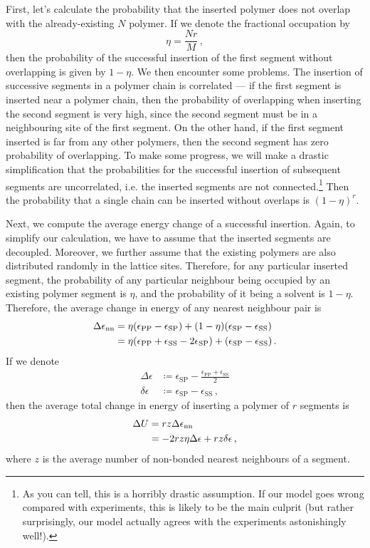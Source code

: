 \documentclass{article}
\theoremstyle{plain}\theoremheaderfont{\normalfont\bfseries}\theorembodyfont{\rmfamily}\theoremseparator{.}\newtheorem*{thm}{Theorem}\newtheorem*{law}{Law}\newtheorem*{pos}{Postulate}
\numberwithin{equation}{section}
\begin{document}
    First, let's calculate the probability that the inserted polymer does not overlap with the already-existing \(N\) polymer. If we denote the fractional occupation by
    \begin{equation}
        \eta=\frac{Nr}{M}\,,
    \end{equation}
    then the probability of the successful insertion of the first segment without overlapping is given by \(1-\eta\). We then encounter some problems. The insertion of successive segments in a polymer chain is correlated --- if the first segment is inserted near a polymer chain, then the probability of overlapping when inserting the second segment is very high, since the second segment must be in a neighbouring site of the first segment. On the other hand, if the first segment inserted is far from any other polymers, then the second segment has zero probability of overlapping. To make some progress, we will make a drastic simplification that the probabilities for the successful insertion of subsequent segments are uncorrelated, i.e. the inserted segments are not connected.\footnote{As you can tell, this is a horribly drastic assumption. If our model goes wrong compared with experiments, this is likely to be the main culprit (but rather surprisingly, our model actually agrees with the experiments astonishingly well!).} Then the probability that a single chain can be inserted without overlaps is \((1-\eta)^r\).

    Next, we compute the average energy change of a successful insertion. Again, to simplify our calculation, we have to assume that the inserted segments are decoupled. Moreover, we further assume that the existing polymers are also distributed randomly in the lattice sites. Therefore, for any particular inserted segment, the probability of any particular neighbour being occupied by an existing polymer segment is \(\eta\), and the probability of it being a solvent is \(1-\eta\). Therefore, the average change in energy of any nearest neighbour pair is
    \begin{align}
        \Delta\epsilon_{\text{nn}}&=\eta(\epsilon_{\text{{PP}}}-\epsilon_{\text{SP}})+(1-\eta)(\epsilon_{\text{SP}}-\epsilon_{\text{SS}})\notag\\
        &=\eta(\epsilon_{\text{PP}}+\epsilon_{\text{SS}}-2\epsilon_{\text{SP}})+(\epsilon_{\text{SP}}-\epsilon_{\text{SS}})\,.
    \end{align}
    If we denote
    \begin{align}
        \Delta\epsilon&\coloneqq\epsilon_{\text{SP}}-\frac{\epsilon_{\text{PP}}+\epsilon_{\text{SS}}}{2}\\
        \delta\epsilon&\coloneqq\epsilon_{\text{SP}}-\epsilon_{\text{SS}}\,,
    \end{align}
    then the average total change in energy of inserting a polymer of \(r\) segments is
    \begin{align}
        \Delta U&=rz\Delta\epsilon_{\text{nn}}\notag\\
        &=-2rz\eta\Delta\epsilon+rz\delta\epsilon\,,
    \end{align}
    where \(z\) is the average number of non-bonded nearest neighbours of a segment.
\end{document}
